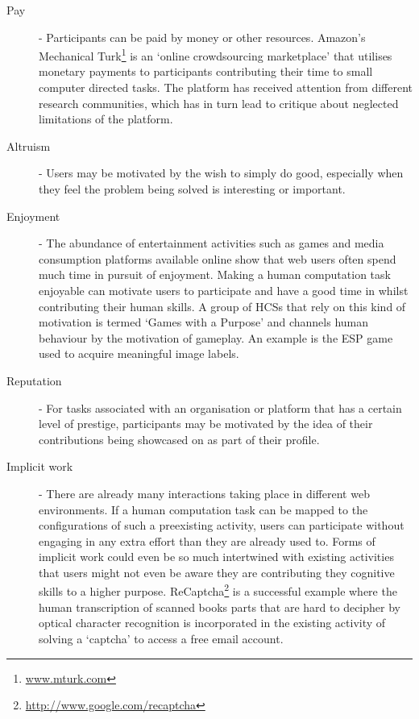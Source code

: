 \begin{description}
  \item[Pay] - Participants can be paid by money or other resources\cite{Biewald:2011us}. Amazon's Mechanical Turk\footnote{\url{www.mturk.com}} is an `online crowdsourcing marketplace' that utilises monetary payments to participants contributing their time to small computer directed tasks. The platform has received attention from different research communities\cite{Buhrmester:2011cw,Paolacci:2010ws,Kittur:2008tu}, which has in turn lead to critique about neglected limitations of the platform\cite{Adar:2011ur}. 
  \item[Altruism] - Users may be motivated by the wish to simply do good, especially when they feel the problem being solved is interesting or important.
  \item[Enjoyment] - The abundance of entertainment activities such as games and media consumption platforms available online show that web users often spend much time in pursuit of enjoyment. Making a human computation task enjoyable can motivate users to participate and have a good time in whilst contributing their human skills. A group of HCSs that rely on this kind of motivation is termed `Games with a Purpose'\cite{vonAhn:2008iy} and channels human behaviour by the motivation of gameplay. An example is the ESP game used to acquire meaningful image labels\cite{VonAhn:2004vd}.
  \item[Reputation] - For tasks associated with an organisation or platform that has a certain level of prestige, participants may be motivated by the idea of their contributions being showcased on as part of their profile.
  \item[Implicit work] - There are already many interactions taking place in different web environments. If a human computation task can be mapped to the configurations of such a preexisting activity, users can participate without engaging in any extra effort than they are already used to. Forms of implicit work could even be so much intertwined with existing activities that users might not even be aware they are contributing they cognitive skills to a higher purpose. ReCaptcha\footnote{\url{http://www.google.com/recaptcha}} is a successful example where the human transcription of scanned books parts that are hard to decipher by optical character recognition is incorporated in the existing activity of solving a `captcha' to access a free email account\cite{VonAhn:2008bu}.
\end{description}
  
